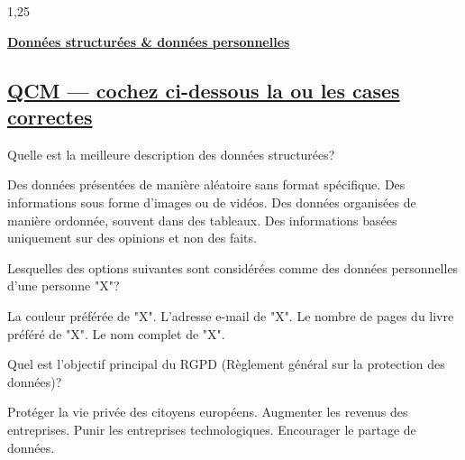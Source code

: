 \documentclass[11pt,a4paper]{exam}
\begin{document}
    \begin{spacing}{1,25}
        \begin{questions} %
        	\noaddpoints
        	\question[9] \textbf{\underline{Données structurées \& données personnelles}}
        	\begin{parts}
        		\noaddpoints
        		\part{\underline{QCM --- cochez ci-dessous la ou les cases correctes}}
        		\addpoints
        		\begin{subparts}
        			\subpart[1]Quelle est la meilleure description des données structurées?
        			\begin{checkboxes}
	        			\choice Des données présentées de manière aléatoire sans format spécifique.
	        			\choice Des informations sous forme d'images ou de vidéos.
	        			\correctchoice Des données organisées de manière ordonnée, souvent dans des tableaux.
	        			\choice Des informations basées uniquement sur des opinions et non des faits.
        			\end{checkboxes}
        			\subpart[1]Lesquelles des options suivantes sont considérées comme des données personnelles d'une personne "X"?
        			\begin{checkboxes}
        				\choice La couleur préférée de "X".
        				\correctchoice L'adresse e-mail de "X".
        				\choice Le nombre de pages du livre préféré de "X".
        				\correctchoice  Le nom complet de "X".
        			\end{checkboxes}
        			\subpart[1] Quel est l'objectif principal du RGPD (Règlement général sur la protection des données)?
        			\begin{checkboxes}
	        			\correctchoice Protéger la vie privée des citoyens européens.
	        			\choice Augmenter les revenus des entreprises.
	        			\choice Punir les entreprises technologiques.
	        			\choice Encourager le partage de données.
	        		\end{checkboxes}
        		\end{subparts}
        		\noaddpoints

\end{parts}
\end{questions}
\end{spacing}
\end{document}
